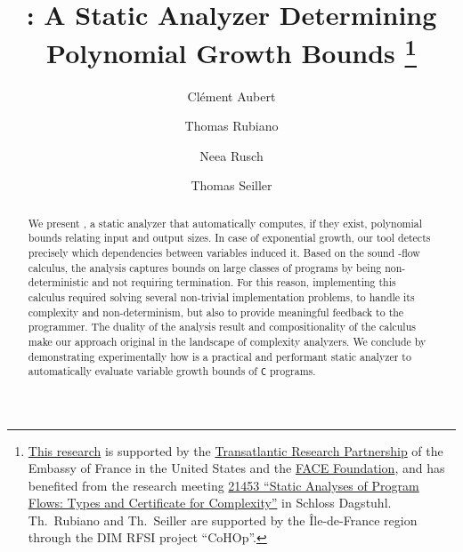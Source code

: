 \documentclass[runningheads]{llncs}
\begin{document}
\title{\pymwp: A Static Analyzer Determining Polynomial Growth Bounds%
    \texorpdfstring{%
        \thanks{
            \href{https://spots.augusta.edu/caubert/research/statycc/}{This research} is supported by the \href{https://face-foundation.org/transatlantic-study-research/transatlantic-research-partnership/}{Transatlantic Research Partnership} of the Embassy of France in the United States and the \href{https://face-foundation.org/}{FACE Foundation}, and has benefited from the research meeting \href{https://www.dagstuhl.de/de/programm/kalender/evhp/?semnr=21453}{21453 \enquote{Static Analyses of Program Flows: Types and Certificate for Complexity}} in Schloss Dagstuhl. Th.\ Rubiano and Th.\ Seiller are supported by the Île-de-France region through the DIM RFSI project \enquote{CoHOp}. 
        }}%
    {}
}
%
\author{
        Clément Aubert\texorpdfstring{}{} \and
        Thomas Rubiano\texorpdfstring{}{} \and
        Neea Rusch\texorpdfstring{}{} \and
        Thomas Seiller\texorpdfstring{}{}
}



\maketitle

\begin{abstract}
We present \pymwp, a static analyzer that automatically computes, if they exist, polynomial bounds relating input and output sizes. In case of exponential growth, our tool detects precisely which dependencies between variables induced it. Based on the sound \mwp-flow calculus, the analysis captures bounds on large classes of programs by being non-deterministic and not requiring termination. For this reason, implementing this calculus required solving several non-trivial implementation problems, to handle its complexity and non-determinism, but also to provide meaningful feedback to the programmer. The duality of the analysis result and compositionality of the calculus make our approach original in the landscape of complexity analyzers. We conclude by demonstrating experimentally how \pymwp is a practical and performant static analyzer to automatically evaluate variable growth bounds of \texttt{C} programs.

\end{abstract}
\end{document}
